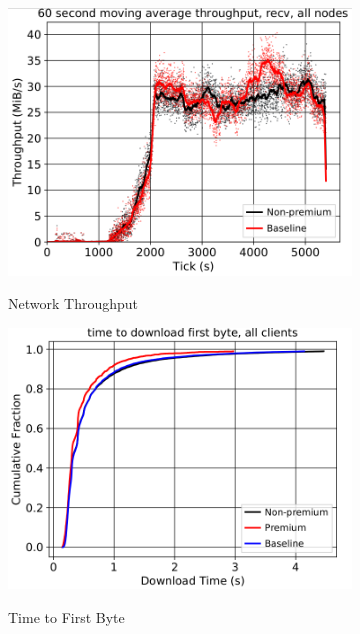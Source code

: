 \begin{figure} \centering
	\begin{subfigure}[t]{0.32\textwidth} \centering
\includegraphics[scale=0.2]{images/throughput_temp.png}
		\label{fig:payments_a}
		\caption{Network Throughput}
	\end{subfigure}
	\begin{subfigure}[t]{0.32\textwidth} \centering
\includegraphics[scale=0.2]{images/ttfirstbyte_temp.png}
		\label{fig:payments_b}
		\caption{Time to First Byte}
	\end{subfigure}
	\begin{subfigure}[t]{0.32\textwidth} \centering

\end{subfigure}
\end{figure}
